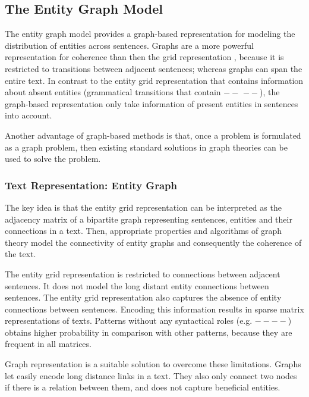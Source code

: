 \subsection{The Entity Graph Model}
\label{sec:ent_graph}
%
The entity graph \cite{guinaudeau13} model provides a graph-based representation for modeling the distribution of entities across sentences. 
Graphs are a more powerful representation for coherence than then the grid representation  \cite{barzilay08}, because it is restricted to transitions between adjacent sentences; whereas graphs can span the entire text.  
In contrast to the entity grid representation that contains information about absent entities (grammatical  transitions that contain $--$ $--$), the graph-based representation only take information of present entities in sentences into account.  

Another advantage of graph-based methods is that, once a problem is formulated as a graph problem, then existing standard solutions in graph theories can be used to solve the problem. 

\subsubsection{Text Representation: Entity Graph}
%

The key idea is that the entity grid representation \cite{barzilay08} can be interpreted as the adjacency matrix of a bipartite graph representing  sentences, entities and their connections in a text. 
Then, appropriate properties and algorithms of graph theory model the connectivity of entity graphs and consequently the coherence of the text. 

The entity grid representation is restricted to connections between adjacent sentences. 
It does not model the long distant entity connections between sentences. 
The entity grid representation also captures the absence of entity connections between sentences. 
Encoding this information results in sparse matrix representations of texts. 
Patterns without any syntactical roles (e.g. $-- --$) obtains higher probability in comparison with other patterns, because they are frequent in all matrices. 

Graph representation is a suitable solution to overcome these limitations. 
Graphs let easily encode long distance links in a text. 
They also only connect two nodes if there is a relation between them, and does not capture beneficial entities. 

